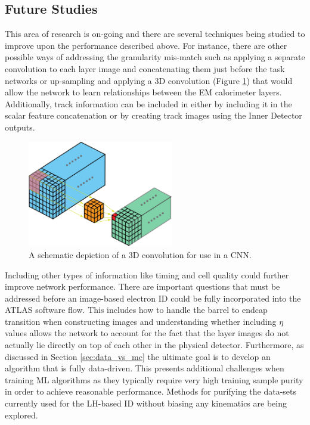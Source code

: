 \subsection{Future Studies}
This area of research is on-going and there are several techniques being studied to improve upon the performance described above. For instance, there are other possible ways of addressing the granularity mis-match such as applying a separate convolution to each layer image and concatenating them just before the task networks or up-sampling and applying a 3D convolution (Figure \ref{fig:3d_conv}) that would allow the network to learn relationships between the EM calorimeter layers. Additionally, track information can be included in either by including it in the scalar feature concatenation or by creating track images using the Inner Detector outputs.\\

\begin{figure}[htb!]
    \centering
    \includegraphics[width=2.5in]{figures/chapter5/3d_conv.png}
    \caption{A schematic depiction of a 3D convolution for use in a CNN.}
    \label{fig:3d_conv}
\end{figure}

Including other types of information like timing and cell quality could further improve network performance. There are important questions that must be addressed before an image-based electron ID could be fully incorporated into the ATLAS software flow. This includes how to handle the barrel to endcap transition when constructing images and understanding whether including $\eta$ values allows the network to account for the fact that the layer images do not actually lie directly on top of each other in the physical detector. Furthermore, as discussed in Section \ref{sec:data_vs_mc} the ultimate goal is to develop an algorithm that is fully data-driven. This presents additional challenges when training ML algorithms as they typically require very high training sample purity in order to achieve reasonable performance. Methods for purifying the data-sets currently used for the LH-based ID without biasing any kinematics are being explored.
